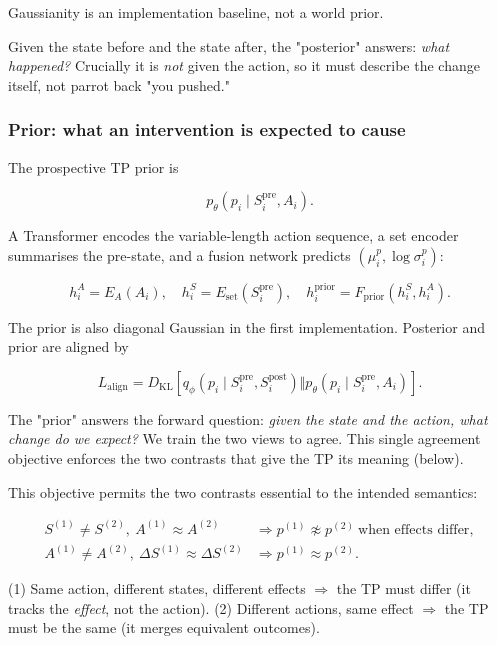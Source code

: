 \documentclass[11pt]{article}
\newenvironment{plainword}{%
  \par\medskip\noindent\begin{minipage}{\textwidth}%
  \color{gray!75!black}\small\itshape
}{%
  \end{minipage}\par\medskip}
\begin{document}
Gaussianity is an implementation baseline, not a world prior.

\begin{plainword}
Given the state before and the state after, the "posterior" answers: \emph{what happened?} Crucially it is \emph{not} given the
action, so it must describe the change itself, not parrot back "you pushed."
\end{plainword}

\subsubsection*{Prior: what an intervention is expected to cause}

The prospective TP prior is

\[
\boxed{p_\theta(p_i\mid S_i^{\mathrm{pre}},A_i).}
\]

A Transformer encodes the variable-length action sequence, a set encoder summarises the pre-state, and a fusion network predicts
$(\mu_i^p,\log\sigma_i^p)$:

\[
h_i^A=E_A(A_i),\quad h_i^S=E_{\mathrm{set}}(S_i^{\mathrm{pre}}),\quad
h_i^{\mathrm{prior}}=F_{\mathrm{prior}}(h_i^S,h_i^A).
\]

The prior is also diagonal Gaussian in the first implementation. Posterior and prior are aligned by

\[
\boxed{
L_{\mathrm{align}}=
D_{\mathrm{KL}}\!\left[
q_\phi(p_i\mid S_i^{\mathrm{pre}},S_i^{\mathrm{post}})
\Vert
p_\theta(p_i\mid S_i^{\mathrm{pre}},A_i)
\right].}
\]

\begin{plainword}
The "prior" answers the forward question: \emph{given the state and the action, what change do we expect?} We train the two views to
agree. This single agreement objective enforces the two contrasts that give the TP its meaning (below).
\end{plainword}

This objective permits the two contrasts essential to the intended semantics:

\[
\begin{aligned}
S^{(1)}\neq S^{(2)},\ A^{(1)}\approx A^{(2)}
&\Rightarrow p^{(1)}\not\approx p^{(2)}\ \text{when effects differ},\\
A^{(1)}\neq A^{(2)},\ \Delta S^{(1)}\approx\Delta S^{(2)}
&\Rightarrow p^{(1)}\approx p^{(2)}.
\end{aligned}
\]

\begin{plainword}
(1) Same action, different states, different effects $\Rightarrow$ the TP must differ (it tracks the \emph{effect}, not the action).
(2) Different actions, same effect $\Rightarrow$ the TP must be the same (it merges equivalent outcomes).
\end{plainword}
\end{document}
